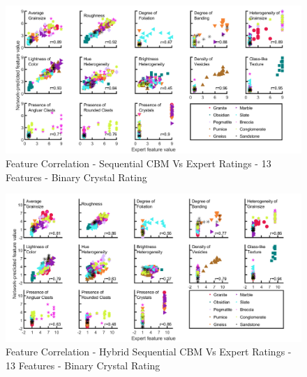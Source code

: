 \begin{figure}[H]
  \centering
    \includegraphics[width=\textwidth]{images/MATLAB Correlation - C2_Vs_Expert - 13 Feautres - Binary.png}
    \caption{Feature Correlation - Sequential CBM Vs Expert Ratings - 13 Features - Binary Crystal Rating} \label{fig:Feature Correlation - Sequential CBM Vs Expert Ratings - 13 Features - Binary Crystal Rating}
\end{figure}

\begin{figure}[H]
  \centering
    \includegraphics[width=\textwidth]{images/MATLAB Correlation - Hybrid_Vs_Expert - 13 Feautres - Binary.png}
    \caption{Feature Correlation - Hybrid Sequential CBM Vs Expert Ratings - 13 Features - Binary Crystal Rating} \label{fig:Feature Correlation - Hybrid Sequential CBM Vs Expert Ratings - 13 Features - Binary Crystal Rating}
\end{figure}

